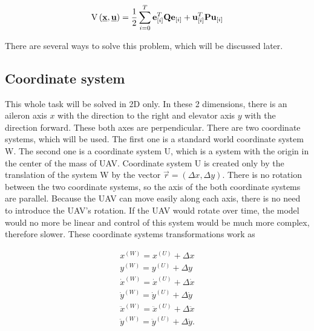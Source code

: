 \documentclass{article}
\newcommand{\uvec}{\textbf{\underline{u}}}
\begin{document}
\begin{equation}
\label{eq:QP_formulation}
\begin{split}
\mathrm{V}\left(\textbf{\underline{x}}, \uvec\right) = \frac{1}{2}\sum_{i=0}^{T}\textbf{e}^T_{[i]}\textbf{Q}\textbf{e}_{[i]} + \textbf{u}^T_{[i]}\textbf{P}\textbf{u}_{[i]}
\end{split}
\end{equation}


There are several ways to solve this problem, which will be discussed later.





\subsection{Coordinate system}
\label{ssec:coordinate_system}
This whole task will be solved in 2D only. In these 2 dimensions, there is an aileron axis $x$ with the direction to the right and elevator axis $y$ with the direction forward. These both axes are perpendicular. There are two coordinate systems, which will be used. The first one is a standard world coordinate system W. The second one is a coordinate system U, which is a system with the origin in the center of the mass of UAV. Coordinate system U is created only by the translation of the system W by the vector $\vec{r} = (\Delta x, \Delta y)$. There is no rotation between the two coordinate systems, so the axis of the both coordinate systems are parallel. Because the UAV can move easily along each axis, there is no need to introduce the UAV's rotation. If the UAV would rotate over time, the model would no more be linear and control of this system would be much more complex, therefore slower. These coordinate systems transformations work as

\begin{equation}
\label{eq:coordinate_transform}
\begin{split}
x^{(W)} = x^{(U)}+\Delta x	\\
y^{(W)} = y^{(U)}+\Delta y	\\
\dot{x}^{(W)} = \dot{x}^{(U)}+\Delta \dot{x}	\\
\dot{y}^{(W)} = \dot{y}^{(U)}+\Delta \dot{y}	\\
\ddot{x}^{(W)} = \ddot{x}^{(U)}+\Delta \ddot{x}	\\
\ddot{y}^{(W)} = \ddot{y}^{(U)}+\Delta \ddot{y}.	\\
\end{split}
\end{equation}
\end{document}
